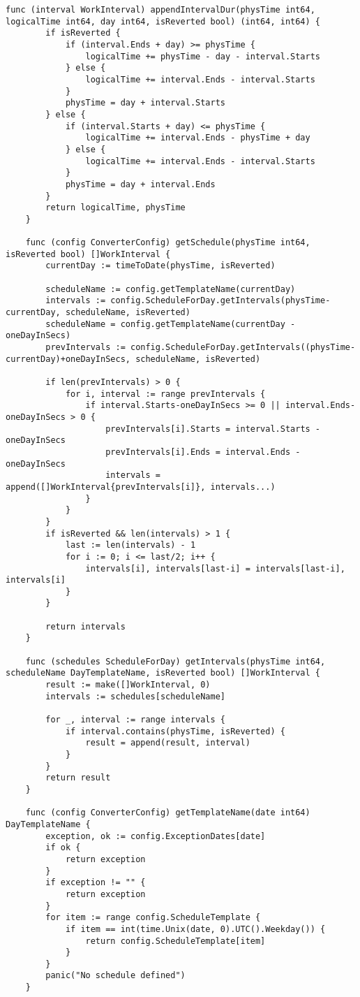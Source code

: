 \begin{lstlisting}[language=Golang,caption={Реализация отображения логического времени на физическое},label=lst:time]
	func (interval WorkInterval) appendIntervalDur(physTime int64, logicalTime int64, day int64, isReverted bool) (int64, int64) {
		if isReverted {
			if (interval.Ends + day) >= physTime {
				logicalTime += physTime - day - interval.Starts
			} else {
				logicalTime += interval.Ends - interval.Starts
			}
			physTime = day + interval.Starts
		} else {
			if (interval.Starts + day) <= physTime {
				logicalTime += interval.Ends - physTime + day
			} else {
				logicalTime += interval.Ends - interval.Starts
			}
			physTime = day + interval.Ends
		}
		return logicalTime, physTime
	}
	
	func (config ConverterConfig) getSchedule(physTime int64, isReverted bool) []WorkInterval {
		currentDay := timeToDate(physTime, isReverted)
	
		scheduleName := config.getTemplateName(currentDay)
		intervals := config.ScheduleForDay.getIntervals(physTime-currentDay, scheduleName, isReverted)
		scheduleName = config.getTemplateName(currentDay - oneDayInSecs)
		prevIntervals := config.ScheduleForDay.getIntervals((physTime-currentDay)+oneDayInSecs, scheduleName, isReverted)
	
		if len(prevIntervals) > 0 {
			for i, interval := range prevIntervals {
				if interval.Starts-oneDayInSecs >= 0 || interval.Ends-oneDayInSecs > 0 {
					prevIntervals[i].Starts = interval.Starts - oneDayInSecs
					prevIntervals[i].Ends = interval.Ends - oneDayInSecs
					intervals = append([]WorkInterval{prevIntervals[i]}, intervals...)
				}
			}
		}
		if isReverted && len(intervals) > 1 {
			last := len(intervals) - 1
			for i := 0; i <= last/2; i++ {
				intervals[i], intervals[last-i] = intervals[last-i], intervals[i]
			}
		}
	
		return intervals
	}
	
	func (schedules ScheduleForDay) getIntervals(physTime int64, scheduleName DayTemplateName, isReverted bool) []WorkInterval {
		result := make([]WorkInterval, 0)
		intervals := schedules[scheduleName]
	
		for _, interval := range intervals {
			if interval.contains(physTime, isReverted) {
				result = append(result, interval)
			}
		}
		return result
	}
	
	func (config ConverterConfig) getTemplateName(date int64) DayTemplateName {
		exception, ok := config.ExceptionDates[date]
		if ok {
			return exception
		}
		if exception != "" {
			return exception
		}
		for item := range config.ScheduleTemplate {
			if item == int(time.Unix(date, 0).UTC().Weekday()) {
				return config.ScheduleTemplate[item]
			}
		}
		panic("No schedule defined")
	}
	
	
\end{lstlisting}